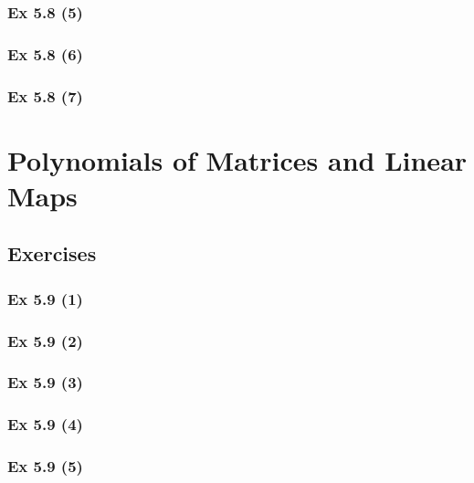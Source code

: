 \subsubsection{Ex 5.8 (5)}\label{sec:Ex_5.8.5}

\subsubsection{Ex 5.8 (6)}\label{sec:Ex_5.8.6}

\subsubsection{Ex 5.8 (7)}\label{sec:Ex_5.8.7}

\newpage		%

\section{Polynomials of Matrices and Linear Maps}\label{sec:5.9}
\subsection{Exercises}\label{sec:5.9_Exercises}

\subsubsection{Ex 5.9 (1)}\label{sec:Ex_5.9.1}

\subsubsection{Ex 5.9 (2)}\label{sec:Ex_5.9.2}

\subsubsection{Ex 5.9 (3)}\label{sec:Ex_5.9.3}

\subsubsection{Ex 5.9 (4)}\label{sec:Ex_5.9.4}

\subsubsection{Ex 5.9 (5)}\label{sec:Ex_5.9.5}

